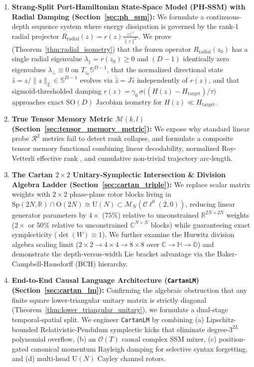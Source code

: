 \documentclass[11pt,a4paper]{article}
\begin{document}
\begin{enumerate}
    \item \textbf{Strang-Split Port-Hamiltonian State-Space Model (PH-SSM) with Radial Damping (Section~\ref{sec:ph_ssm}):} We formulate a continuous-depth sequence system where energy dissipation is governed by the rank-1 radial projector $R_{\text{radial}}(z) = r(z)\frac{zz^\top}{\|z\|^2}$. We prove (Theorem~\ref{thm:radial_isometry}) that the frozen operator $R_{\text{radial}}(z_0)$ has a single radial eigenvalue $\lambda_\parallel = r(z_0) \ge 0$ and $(D-1)$ identically zero eigenvalues $\lambda_\perp \equiv 0$ on $T_{z_0}\mathbb{S}^{D-1}$, that the normalized directional state $\hat{z} = z/\|z\|_2 \in \mathbb{S}^{D-1}$ evolves via $\dot{\hat{z}} = J\hat{z}$ independently of $r(z)$, and that sigmoid-thresholded damping $r(z) = \gamma_0\,\sigma\big((H(z) - H_{\text{target}})/\tau\big)$ approaches exact $\mathrm{SO}(D)$ Jacobian isometry for $H(z) \ll H_{\text{target}}$.
    \item \textbf{True Tensor Memory Metric $\mathcal{M}(k,l)$ (Section~\ref{sec:tensor_memory_metric}):} We expose why standard linear probe $\mathcal{R}^2$ metrics fail to detect rank collapse, and formulate a composite tensor memory functional combining linear decodability, normalized Roy-Vetterli effective rank \cite{roy2007effective}, and cumulative non-trivial trajectory arc-length.
    \item \textbf{The Cartan $2\times 2$ Unitary-Symplectic Intersection \& Division Algebra Ladder (Section~\ref{sec:cartan_triple}):} We replace scalar matrix weights with $2\times 2$ phase-plane rotor blocks living in $\mathrm{Sp}(2N,\mathbb{R})\cap \mathrm{O}(2N) \cong \mathrm{U}(N) \subset \mathcal{M}_N(\mathcal{C}\ell^0(2,0))$, reducing linear generator parameters by $4\times$ ($75\%$) relative to unconstrained $\mathbb{R}^{2N\times 2N}$ weights ($2\times$ or $50\%$ relative to unconstrained $\mathbb{C}^{N\times N}$ blocks) while guaranteeing exact symplecticity ($\det(W)\equiv 1$). We further examine the Hurwitz division algebra scaling limit ($2\times 2 \to 4\times 4 \to 8\times 8$ over $\mathbb{C}\to\mathbb{H}\to\mathbb{O}$) and demonstrate the depth-versus-width Lie bracket advantage via the Baker-Campbell-Hausdorff (BCH) hierarchy.
    \item \textbf{End-to-End Causal Language Architecture (\texttt{CartanLM}) (Section~\ref{sec:cartan_lm}):} Confirming the algebraic obstruction that any finite square lower-triangular unitary matrix is strictly diagonal (Theorem~\ref{thm:lower_triangular_unitary}), we formulate a dual-stage temporal-spatial split. We engineer \texttt{CartanLM} by combining (a) Lipschitz-bounded Relativistic-Pendulum symplectic kicks that eliminate degree-$3^{2L}$ polynomial overflow, (b) an $\mathcal{O}(T)$ causal complex SSM mixer, (c) position-gated canonical momentum Rayleigh damping for selective syntax forgetting, and (d) multi-head $\mathrm{U}(N)$ Cayley channel rotors.

\end{enumerate}
\end{document}
